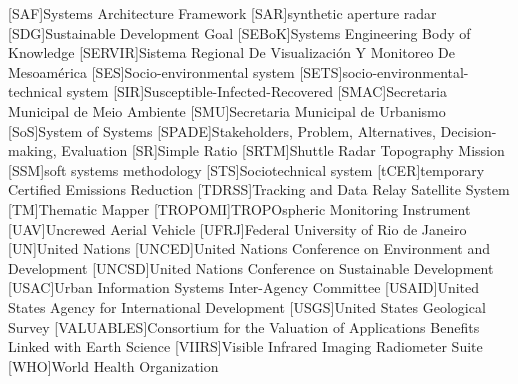 \begin{acronym}[HyperLEAVES]
[SAF]{Systems Architecture Framework}
[SAR]{synthetic aperture radar}
[SDG]{Sustainable Development Goal}
[SEBoK]{Systems Engineering Body of Knowledge}
[SERVIR]{Sistema Regional De Visualizaci\'{o}n Y Monitoreo De Mesoam\'{e}rica}
[SES]{Socio-environmental system}
[SETS]{socio-environmental-
technical system}
[SIR]{Susceptible-Infected-Recovered}
[SMAC]{Secretaria Municipal de Meio Ambiente}
[SMU]{Secretaria Municipal de Urbanismo}
[SoS]{System of Systems}
[SPADE]{Stakeholders, Problem, Alternatives, Decision-making, Evaluation}
[SR]{Simple Ratio}
[SRTM]{Shuttle Radar Topography Mission}
[SSM]{soft systems methodology}
[STS]{Sociotechnical system}
[tCER]{temporary Certified Emissions Reduction}
[TDRSS]{Tracking and Data Relay Satellite System}
[TM]{Thematic Mapper}
[TROPOMI]{TROPOspheric Monitoring Instrument}
[UAV]{Uncrewed Aerial Vehicle}
[UFRJ]{Federal University of Rio de Janeiro}
[UN]{United Nations}
[UNCED]{United Nations Conference on Environment and Development}
[UNCSD]{United Nations Conference on Sustainable Development}
[USAC]{Urban Information Systems Inter-Agency Committee}
[USAID]{United States Agency for International Development}
[USGS]{United States Geological Survey}
[VALUABLES]{Consortium for the Valuation of Applications Benefits Linked with Earth Science}
[VIIRS]{Visible Infrared Imaging Radiometer Suite}
[WHO]{World Health Organization}





\end{acronym}

